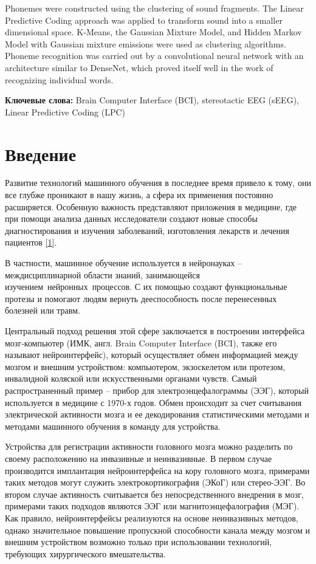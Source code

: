 \documentclass[a4paper,14pt]{extarticle}
\begin{document}
Phonemes were constructed using the clustering of sound fragments. The Linear Predictive Coding approach was applied to transform sound into a smaller dimensional space. K-Means, the Gaussian Mixture Model, and Hidden Markov Model with Gaussian mixture emissions were used as clustering algorithms. Phoneme recognition was carried out by a convolutional neural network with an architecture similar to DenseNet, which proved itself well in the work of recognizing individual words.

\textbf{Ключевые слова:} Brain Computer Interface (BCI), stereotactic EEG (sEEG), Linear Predictive Coding (LPC)

\newpage
{
	\hypersetup{linkcolor=black}
	\tableofcontents
}


\newpage
\section{Введение}

Развитие технологий машинного обучения в последнее время привело к тому, они все глубже проникают в нашу жизнь, а сфера их применения постоянно расширяется. Особенную важность представляют приложения в медицине, где при помощи анализа данных исследователи создают новые способы диагностирования и изучения заболеваний, изготовления лекарств и лечения пациентов \hyperlink{b_1}{[1]}.

В частности, машинное обучение используется в нейронауках – междисциплинарной области знаний, занимающейся изучением нейронных процессов. С их помощью создают функциональные протезы и помогают людям вернуть дееспособность после перенесенных болезней или травм.

Центральный подход решения этой сфере заключается в построении интерфейса мозг-компьютер (ИМК, англ. Brain Computer Interface (BCI), также его называют нейроинтерфейс), который осуществляет обмен информацией между мозгом и внешним устройством: компьютером, экзоскелетом или протезом, инвалидной коляской или искусственными органами чувств. Самый распространенный пример – прибор для электроэнцефалограммы (ЭЭГ), который используется в медицине с 1970-х годов. Обмен происходит за счет считывания электрической активности мозга и ее декодирования статистическими методами и методами машинного обучения в команду для устройства.

Устройства для регистрации активности головного мозга можно разделить по своему расположению на инвазивные и неинвазивные. В первом случае производится имплантация нейроинтерфейса на кору головного мозга, примерами таких методов могут служить электрокортикография (ЭКоГ) или стерео-ЭЭГ. Во втором случае активность считывается без непосредственного внедрения в мозг, примерами таких подходов являются ЭЭГ или магнитоэнцефалография (МЭГ). Как правило, нейроинтерфейсы реализуются на основе неинвазивных методов, однако значительное повышение пропускной способности канала между мозгом и внешним устройством возможно только при использовании технологий, требующих хирургического вмешательства.
\end{document}
